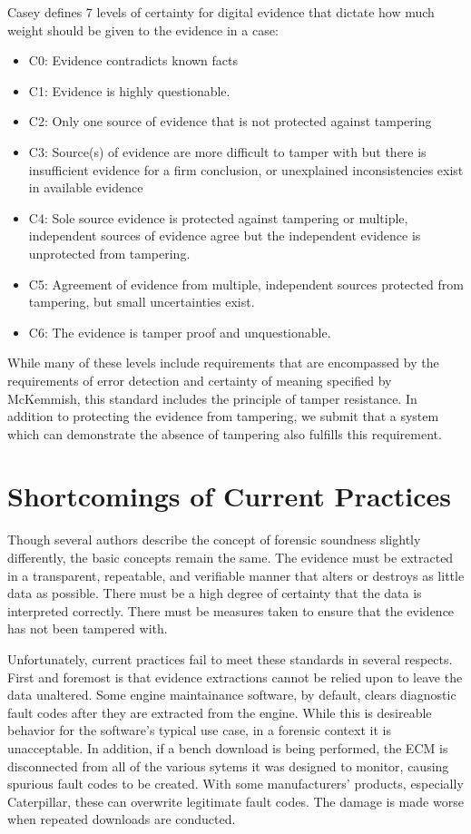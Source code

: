 Casey \cite{casey2002} defines 7 levels of certainty for digital evidence that dictate how much weight should be given to the evidence in a case:

\begin{itemize}
\item C0: Evidence contradicts known facts
\item C1: Evidence is highly questionable.
\item C2: Only one source of evidence that is not protected against tampering
\item C3: Source(s) of evidence are more difficult to tamper with but there is insufficient evidence for a firm conclusion, or unexplained inconsistencies exist in available evidence
\item C4: Sole source evidence is protected against tampering or multiple, independent sources of evidence agree but the independent evidence is unprotected from tampering.
\item C5: Agreement of evidence from multiple, independent sources protected from tampering, but small uncertainties exist.
\item C6: The evidence is tamper proof and unquestionable.
\end{itemize}

While many of these levels include requirements that are encompassed by the requirements of error detection and certainty of meaning 
specified by McKemmish, this standard includes the principle of tamper resistance. In addition to protecting the evidence from tampering, 
we submit that a system which can demonstrate the absence of tampering also fulfills this requirement.

\section{Shortcomings of Current Practices}

Though several authors describe the concept of forensic soundness slightly differently, the basic concepts remain the same. The evidence must be extracted in a transparent,
repeatable, and verifiable manner that alters or destroys as little data as possible. There must be a high degree of certainty that the data is interpreted correctly. There must
be measures taken to ensure that the evidence has not been tampered with.

Unfortunately, current practices fail to meet these standards in several respects. First and foremost is that evidence extractions cannot be relied upon to leave the data unaltered.
Some engine maintainance software, by default, clears diagnostic fault codes after they are extracted from the engine. While this is desireable behavior for the software's typical
use case, in a forensic context it is unacceptable. In addition, if a bench download is being performed, the ECM is disconnected from all of the various sytems it was designed to monitor,
causing spurious fault codes to be created. With some manufacturers' products, especially Caterpillar, these can overwrite legitimate fault codes. The damage is made worse when
repeated downloads are conducted.

